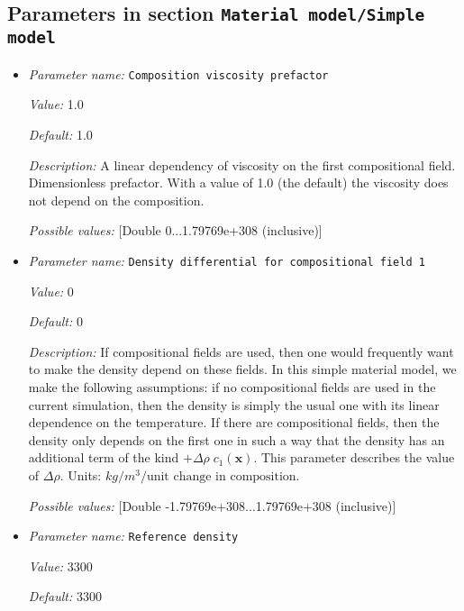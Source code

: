 \subsection{Parameters in section \tt Material model/Simple model}
\label{parameters:Material_20model/Simple_20model}

\begin{itemize}
\item {\it Parameter name:} {\tt Composition viscosity prefactor}


{\it Value:} 1.0


{\it Default:} 1.0


{\it Description:} A linear dependency of viscosity on the first compositional field. Dimensionless prefactor. With a value of 1.0 (the default) the viscosity does not depend on the composition.


{\it Possible values:} [Double 0...1.79769e+308 (inclusive)]
\item {\it Parameter name:} {\tt Density differential for compositional field 1}


{\it Value:} 0


{\it Default:} 0


{\it Description:} If compositional fields are used, then one would frequently want to make the density depend on these fields. In this simple material model, we make the following assumptions: if no compositional fields are used in the current simulation, then the density is simply the usual one with its linear dependence on the temperature. If there are compositional fields, then the density only depends on the first one in such a way that the density has an additional term of the kind $+\Delta \rho \; c_1(\mathbf x)$. This parameter describes the value of $\Delta \rho$. Units: $kg/m^3/\textrm{unit change in composition}$.


{\it Possible values:} [Double -1.79769e+308...1.79769e+308 (inclusive)]
\item {\it Parameter name:} {\tt Reference density}


{\it Value:} 3300


{\it Default:} 3300



\end{itemize}
